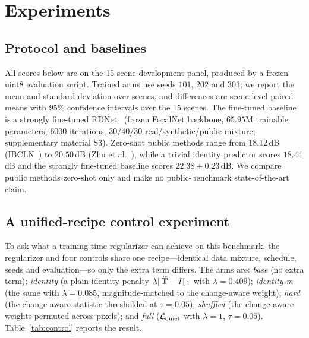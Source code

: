 \section{Experiments}
\label{sec:exp}

\subsection{Protocol and baselines}
\label{sec:setup}
All scores below are on the 15-scene development panel, produced by a frozen
uint8 evaluation script. Trained arms use seeds $101$, $202$ and $303$; we
report the mean and standard deviation over scenes, and differences are
scene-level paired means with $95\%$ confidence intervals over the 15 scenes.
The fine-tuned baseline is a strongly fine-tuned RDNet~\cite{zhao2025rdnet}
(frozen FocalNet backbone, $65.95$M trainable parameters, $6000$ iterations,
$30/40/30$ real/synthetic/public mixture; supplementary material S3). Zero-shot
public methods range from $18.12$\,dB (IBCLN~\cite{li2020ibcln}) to
$20.50$\,dB (Zhu et al.~\cite{zhu2024rrw}), while a trivial identity
predictor scores $18.44$\,dB and the strongly fine-tuned baseline scores
$22.38\pm0.23$\,dB. We compare public methods zero-shot only and make no
public-benchmark state-of-the-art claim.

\subsection{A unified-recipe control experiment}
\label{sec:control}
To ask what a training-time regularizer can achieve on this benchmark, the
regularizer and four controls share one recipe---identical data mixture,
schedule, seeds and evaluation---so only the extra term differs. The arms are:
\emph{base} (no extra term); \emph{identity} (a plain identity penalty
$\lambda\|\widehat{\mathbf{T}}-I\|_1$ with $\lambda=0.409$); \emph{identity-m} (the same with
$\lambda=0.085$, magnitude-matched to the change-aware weight); \emph{hard}
(the change-aware statistic thresholded at $\tau=0.05$); \emph{shuffled} (the
change-aware weights permuted across pixels); and \emph{full} ($\mathcal{L}_{\mathrm{quiet}}$ with
$\lambda=1$, $\tau=0.05$). Table~\ref{tab:control} reports the result.

